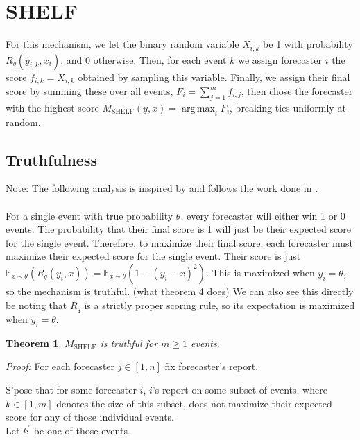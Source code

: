 \documentclass[letterpaper,12pt]{article}
\DeclareMathOperator*{\argmax}{arg\,max}
\newcommand{\E}{\mathbb{E}}
\newcommand{\1}{\mathbbm{1}}
\newtheorem{theorem}{Theorem}
\begin{document}
\section{SHELF}
\newcommand{\shelf}{M_{\mathrm{SHELF}}}

For this mechanism, we let the binary random variable $X_{i, k}$ be 1 with probability $R_q(y_{i, k}, x_i)$, and 0 otherwise. Then, for each event $k$ we assign forecaster $i$ the score $f_{i, k} = X_{i, k}$ obtained by sampling this variable. Finally, we assign their final score by summing these over all events, $F_i = \sum_{j=1}^m f_{i, j}$, then chose the forecaster with the highest score $\shelf(y, x) = \argmax_i F_i$, breaking ties uniformly at random. 

\subsection{Truthfulness}
Note: The following analysis is inspired by and follows the work done in \cite{elf}.\\\\
For a single event with true probability $\theta$, every forecaster will either win 1 or 0 events. The probability that their final score is 1 will just be their expected score for the single event. Therefore, to maximize their final score, each forecaster must maximize their expected score for the single event. Their score is just $\E_{x \sim \theta}(R_q(y_i, x)) = \E_{x \sim \theta}(1 - (y_i - x)^2)$. This is maximized when $y_i = \theta$, so the mechanism is truthful. (what theorem 4 does) We can also see this directly be noting that $R_q$ is a strictly proper scoring rule, so its expectation is maximized when $y_i = \theta$. 

\begin{theorem}
  \label{shelf_truthful}
    $\shelf$ is truthful for $m \geq 1$ events.
\end{theorem}
\emph{Proof:} For each forecaster $j \in [1, n]$ fix forecaster's report.

S'pose that for some forecaster $i$, $i$'s report on some subset of events, where $k \in [1, m]$ denotes the size of this subset, does not maximize their expected score for any of those individual events.\\
Let $k^\prime$ be one of those events.
\end{document}
